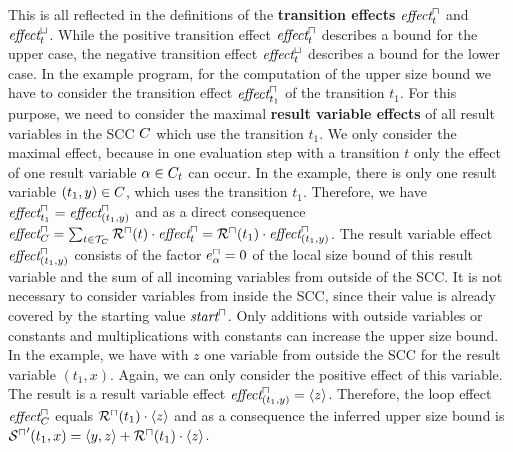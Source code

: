 \begin{example}
  This is all reflected in the definitions of the \textbf{transition effects} $\emph{effect}^\sqcap_t$ and $\emph{effect}^\sqcup_t$.
  While the positive transition effect $\emph{effect}^\sqcap_t$ describes a bound for the upper case, the negative transition effect $\emph{effect}^\sqcup_t$ describes a bound for the lower case.
  In the example program, for the computation of the upper size bound we have to consider the transition effect $\emph{effect}^\sqcap_{t_1}$ of the transition $t_1$.
  For this purpose, we need to consider the maximal \textbf{result variable effects} of all result variables in the SCC $C$ which use the transition $t_1$.
  We only consider the maximal effect, because in one evaluation step with a transition $t$ only the effect of one result variable $\alpha \in C_t$ can occur.
  In the example, there is only one result variable $(t_1,y) \in C$, which uses the transition $t_1$.
  Therefore, we have $\emph{effect}^\sqcap_{t_1} = \emph{effect}^\sqcap_{(t_1,y)}$ and as a direct consequence $\emph{effect}^\sqcap_C = \sum_{t \in \mathcal{T}_C} {\mathcal{R}^\sqcap}(t) \cdot \emph{effect}^\sqcap_{t} = {\mathcal{R}^\sqcap}(t_1) \cdot \emph{effect}^\sqcap_{(t_1,y)}$.
  The result variable effect $\emph{effect}^\sqcap_{(t_1,y)}$ consists of the factor $e^\sqcap_\alpha = 0$ of the local size bound of this result variable and the sum of all incoming variables from outside of the SCC.
  It is not necessary to consider variables from inside the SCC, since their value is already covered by the starting value $\emph{start}^\sqcap$.
  Only additions with outside variables or constants and multiplications with constants can increase the upper size bound.
  In the example, we have with $z$ one variable from outside the SCC for the result variable $(t_1,x)$.
  Again, we can only consider the positive effect of this variable.
  The result is a result variable effect $\emph{effect}^\sqcap_{(t_1,y)} = \langle z\rangle$.
  Therefore, the loop effect $\emph{effect}^\sqcap_C$ equals ${\mathcal{R}^\sqcap}(t_1) \cdot \langle z\rangle$ and as a consequence the inferred upper size bound is ${\mathcal{S}^\sqcap}'(t_1,x) = \langle y,z\rangle + {\mathcal{R}^\sqcap}(t_1) \cdot \langle z\rangle$.
\end{example}

\begin{example}[Lowercase]

\end{example}

